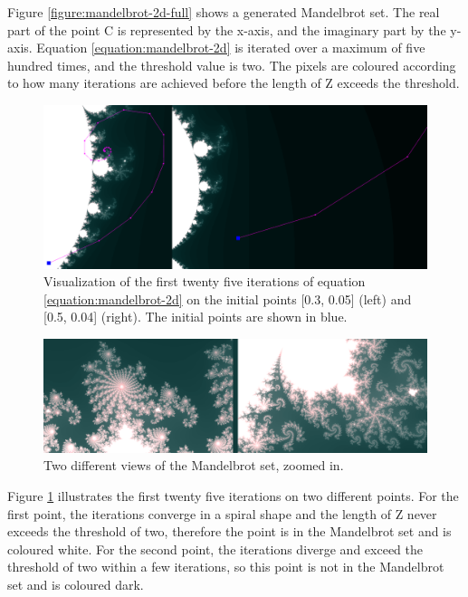 Figure \ref{figure:mandelbrot-2d-full} shows a generated Mandelbrot set. The real part of the point C is represented by the x-axis, and the imaginary part by the y-axis. Equation \ref{equation:mandelbrot-2d} is iterated over a maximum of five hundred times, and the threshold value is two. The pixels are coloured according to how many iterations are achieved before the length of Z exceeds the threshold.

\begin{figure} [ht]
	\centering
	\includegraphics[width=0.8\linewidth, frame]{Images/Mandelbrot-2D-Iterations.png}
	\caption{Visualization of the first twenty five iterations of equation \ref{equation:mandelbrot-2d} on the initial points [0.3, 0.05] (left) and [0.5, 0.04] (right). The initial points are shown in blue.}
	\label{figure:mandelbrot-2d-iterations}
\end{figure}

\begin{figure} [ht]
	\centering
	\includegraphics[width=0.8\linewidth, frame]{Images/Mandelbrot-2D-Zoom.png}
	\caption{Two different views of the Mandelbrot set, zoomed in.}
	\label{figure:mandelbrot-2d-zoom}
\end{figure}

Figure \ref{figure:mandelbrot-2d-iterations} illustrates the first twenty five iterations on two different points. For the first point, the iterations converge in a spiral shape and the length of Z never exceeds the threshold of two, therefore the point is in the Mandelbrot set and is coloured white. For the second point, the iterations diverge and exceed the threshold of two within a few iterations, so this point is not in the Mandelbrot set and is coloured dark.\newline

